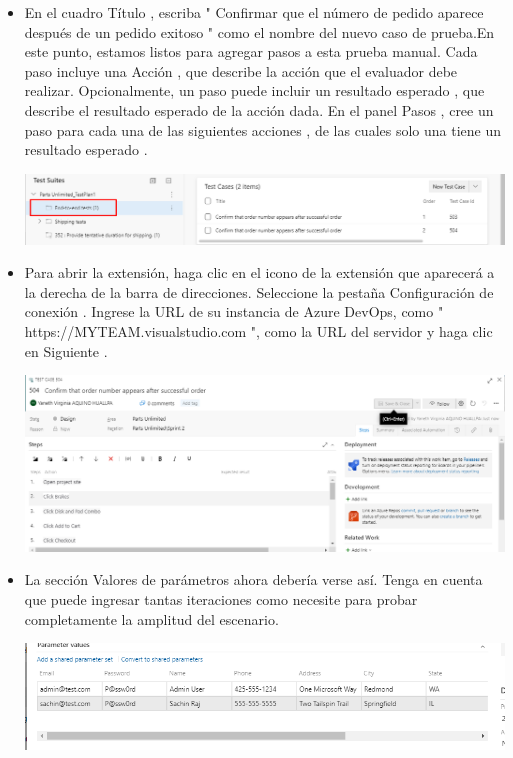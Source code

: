 \begin{itemize}


\item En el cuadro Título , escriba " Confirmar que el número de pedido aparece después de un pedido exitoso " como el nombre del nuevo caso de prueba.En este punto, estamos listos para agregar pasos a esta prueba manual. Cada paso incluye una Acción , que describe la acción que el evaluador debe realizar. Opcionalmente, un paso puede incluir un resultado esperado , que describe el resultado esperado de la acción dada. En el panel Pasos , cree un paso para cada una de las siguientes acciones , de las cuales solo una tiene un resultado esperado .
\begin{center}
\includegraphics[width=\columnwidth]{images/32}\newline
\end{center} 
\item Para abrir la extensión, haga clic en el icono de la extensión que aparecerá a la derecha de la barra de direcciones. Seleccione la pestaña Configuración de conexión . Ingrese la URL de su instancia de Azure DevOps, como " https://MYTEAM.visualstudio.com ", como la URL del servidor y haga clic en Siguiente .
\begin{center}
\includegraphics[width=\columnwidth]{images/30}\newline
\end{center} 
\item La sección Valores de parámetros ahora debería verse así. Tenga en cuenta que puede ingresar tantas iteraciones como necesite para probar completamente la amplitud del escenario.
\begin{center}
\includegraphics[width=\columnwidth]{images/31}\newline
\end{center} 

\end{itemize}



